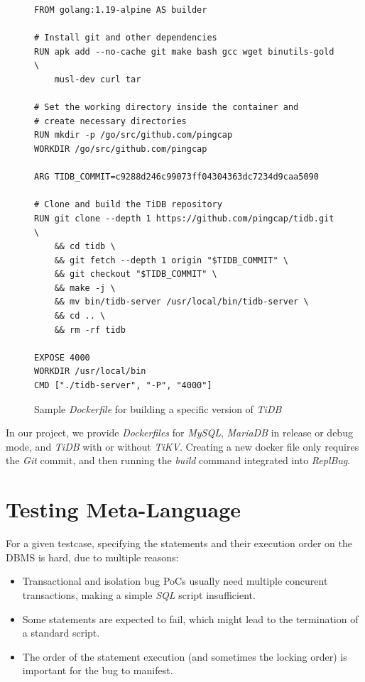 \begin{figure}
\begin{verbatim}
FROM golang:1.19-alpine AS builder

# Install git and other dependencies
RUN apk add --no-cache git make bash gcc wget binutils-gold \
    musl-dev curl tar

# Set the working directory inside the container and
# create necessary directories
RUN mkdir -p /go/src/github.com/pingcap
WORKDIR /go/src/github.com/pingcap

ARG TIDB_COMMIT=c9288d246c99073ff04304363dc7234d9caa5090

# Clone and build the TiDB repository
RUN git clone --depth 1 https://github.com/pingcap/tidb.git \
    && cd tidb \
    && git fetch --depth 1 origin "$TIDB_COMMIT" \
    && git checkout "$TIDB_COMMIT" \
    && make -j \
    && mv bin/tidb-server /usr/local/bin/tidb-server \
    && cd .. \
    && rm -rf tidb

EXPOSE 4000
WORKDIR /usr/local/bin
CMD ["./tidb-server", "-P", "4000"]    
\end{verbatim}
\caption{Sample \textit{Dockerfile} for building a specific version of \textit{TiDB}}
\label{fig:dockerfilesample}
\end{figure}

In our project, we provide \textit{Dockerfiles} for \textit{MySQL}, \textit{MariaDB} in release or debug mode, and \textit{TiDB} with or without \textit{TiKV}. Creating a new docker file only requires the \textit{Git} commit, and then running the \textit{build} command integrated into \textit{ReplBug}. 

\section{Testing Meta-Language}

For a given testcase, specifying the statements and their execution order on the DBMS is hard, due to multiple reasons:
\begin{itemize}
    \item Transactional and isolation bug PoCs usually need multiple concurent transactions, making a simple \textit{SQL} script insufficient.
    \item Some statements are expected to fail, which might lead to the termination of a standard script.
    \item The order of the statement execution (and sometimes the locking order) is important for the bug to manifest.
\end{itemize} 

